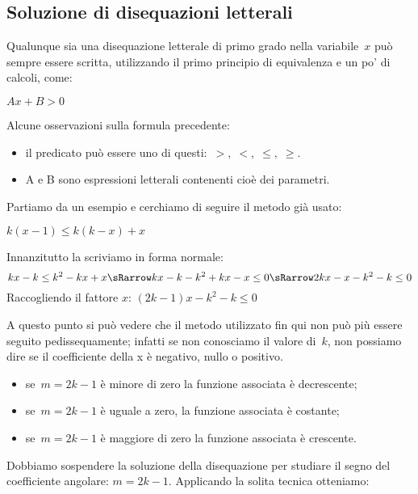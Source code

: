 \subsection{Soluzione di disequazioni letterali}
\label{sec:dis_tetterali}

Qualunque sia una disequazione letterale di primo grado nella 
variabile~\(x\) può sempre essere scritta, utilizzando il primo 
principio di equivalenza e un po' di calcoli, come:

\(A x + B > 0\)

Alcune osservazioni sulla formula precedente:

\begin{itemize} [noitemsep]
 \item il predicato può essere uno di questi:~\(>, \; <, \; \le, \; \ge\).
 \item A e B sono espressioni letterali contenenti cioè dei parametri.
\end{itemize}

Partiamo da un  esempio e cerchiamo di seguire il metodo già usato:

\(k \left( x -1 \right )\le k \left ( k - x \right ) + x\)

Innanzitutto la scriviamo in forma normale:
\[k x - k \le k^2 - k x + x \sRarrow k x - k - k^2 + k x - x \le 0 \sRarrow
2 k x - x - k^2 - k \le 0 \]
Raccogliendo il fattore \(x\): \quad 
\(\left (2 k - 1 \right ) x - k^2 - k \le 0\)

A questo punto si può vedere che il metodo utilizzato fin qui non può più 
essere seguito pedissequamente; infatti se non conosciamo il valore 
di~\(k\), non possiamo dire se il coefficiente della x è negativo, nullo 
o positivo.

\begin{itemize} [noitemsep]
\item se~\(m = 2k -1\) è minore di zero la funzione associata è 
decrescente;
\item se~\(m = 2k -1\) è uguale a zero, la funzione associata è costante;
\item se~\(m = 2k -1\) è maggiore di zero la funzione associata è 
crescente.
\end{itemize}


Dobbiamo sospendere la soluzione della disequazione per studiare il segno 
del coefficiente angolare: \(m = 2k -1\). 
Applicando la solita tecnica otteniamo:

